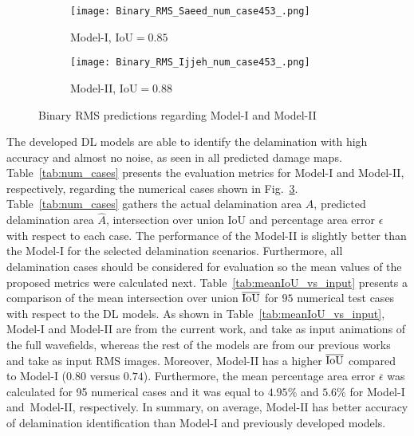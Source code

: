 \begin{sloppypar}
\begin{figure}[ht!]
\begin{subfigure}[b]{0.32\textwidth}
			\centering
			\texttt{[image: Binary\_RMS\_Saeed\_num\_case453\_.png]}
			\caption{Model-I, IoU\(=0.85\)}
			\label{fig:Convlstm_binary_RMS_453}
		\end{subfigure}
		\hfill
		\begin{subfigure}[b]{0.32\textwidth}
			\centering
			\texttt{[image: Binary\_RMS\_Ijjeh\_num\_case453\_.png]}
			\caption{Model-II, IoU\(=0.88\)}
			\label{fig:AE_binary_RMS_453}
		\end{subfigure}
		\caption{Binary RMS predictions regarding Model-I and Model-II}
		\label{fig:RMS_num_cases}
	\end{figure}
	
	The developed DL models are able to identify the delamination with high accuracy and almost no noise, as seen in all predicted damage maps.
	Table~\ref{tab:num_cases} presents the evaluation metrics for Model-I and Model-II, respectively, regarding the numerical cases shown in Fig.~\ref{fig:RMS_num_cases}.
	Table~\ref{tab:num_cases} gathers the actual delamination area \(A\), predicted delamination area \(\hat{A}\), intersection over union IoU and percentage area error \(\epsilon\) with respect to each case. 
	The performance of the Model-II is slightly better than the Model-I for the selected delamination scenarios.
	Furthermore, all delamination cases should be considered for evaluation so the mean values of the proposed metrics were calculated next.
	Table~\ref{tab:meanIoU_vs_input} presents a comparison of the mean intersection over union \(\overline{\textup{IoU}}\) for \(95\) numerical test cases with respect to the DL models.
	As shown in Table~\ref{tab:meanIoU_vs_input}, Model-I and Model-II are from the current work, and take as input animations of the full wavefields, whereas the rest of the models are from our previous works~\cite{Ijjeh2021, Ijjeh2022} and take as input RMS images.
	Moreover, Model-II has a higher \(\overline{\textup{IoU}}\) compared to Model-I (\(0.80\) versus \(0.74\)).
	Furthermore, the mean percentage area error \(\overline{\epsilon}\) was calculated for 95 numerical cases and it was equal to \(4.95 \%\) and \(5.6\%\) for Model-I and~Model-II, respectively.
	In summary, on average, Model-II has better accuracy of delamination identification than Model-I and previously developed models.
	\begin{table}[ht!]

\end{table}
\end{sloppypar}
